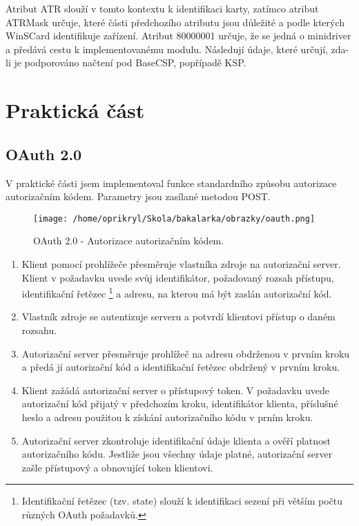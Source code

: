 \documentclass[]{fithesis3}
\begin{document}
		Atribut ATR slouží v tomto kontextu k identifikaci karty, zatímco atribut ATRMask určuje, 			které části předchozího atributu jsou důležité a podle kterých WinSCard identifikuje 				zařízení. 	Atribut 80000001 určuje, že se jedná o minidriver a předává cestu k 					implementovanému modulu. Následují údaje, které určují, zda-li je podporováno načtení pod 		BaseCSP, popřípadě KSP.

\chapter{Praktická část}

	\section{OAuth 2.0}

	V praktické části jsem implementoval funkce standardního způsobu autorizace 					autorizačním kódem. Parametry jsou zasílané metodou POST.

	\begin{figure}[!ht]
		\begin{center}
  		\begin{minipage}{0.80\textwidth}
    			\texttt{[image: /home/oprikryl/Skola/bakalarka/obrazky/oauth.png]}
  		\end{minipage}
		\end{center}
 		\caption{OAuth 2.0 - Autorizace autorizačním kódem.}
  		\label{fig:oauth}
	\end{figure}

	\begin{enumerate}
		\item {
		Klient pomocí prohlížeče přesměruje vlastníka zdroje na autorizační server. Klient v 				požadavku uvede svůj identifikátor, požadovaný rozsah přístupu,  identifikační řetězec
			\footnote {
			Identifikační řetězec (tzv. state) slouží k identifikaci sezení při větším počtu různých 				OAuth požadavků.
			}	 
		a adresu, na kterou má být zaslán autorizační kód.
		}
		\item
		Vlastník zdroje se autentizuje serveru a potvrdí klientovi přístup o daném rozsahu.
		\item
		Autorizační server přesměruje prohlížeč na adresu obdrženou v prvním kroku a předá jí 			autorizační kód a identifikační řetězec obdržený v prvním kroku.
		\item
		Klient zažádá autorizační server o přístupový token. V požadavku uvede autorizační kód 			přijatý v předchozím kroku, identifikátor klienta, příslušné heslo a adresu použitou k 				získání autorizačního kódu v prním kroku. 
		\item	
		Autorizační server zkontroluje identifikační údaje klienta a ověří platnost autorizačního 				kódu. Jestliže jsou všechny údaje platné, autorizační server zašle přístupový a obnovující 			token klientovi.

	\end{enumerate}
\end{document}
